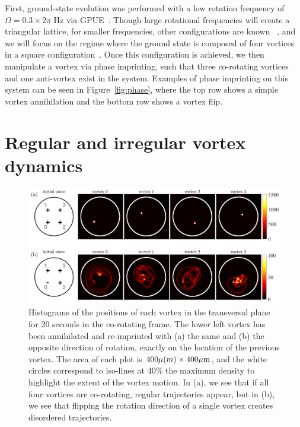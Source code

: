 First, ground-state evolution was performed with a low rotation frequency of $\Omega = 0.3 \times 2\pi$ Hz via GPUE~\cite{schloss2018}.
Though large rotational frequencies will create a triangular lattice, for smaller frequencies, other configurations are known ~\cite{aftalion2001}, and we will focus on the regime where the ground state is composed of four vortices in a square configuration~\cite{zampetaki2013}.
Once this configuration is achieved, we then manipulate a vortex via phase imprinting, such that three co-rotating vortices and one anti-vortex exist in the system.
Examples of phase imprinting on this system can be seen in Figure~\ref{fig:phase}, where the top row shows a simple vortex annihilation and the bottom row shows a vortex flip.

\section{Regular and irregular vortex dynamics}

\begin{figure}
\includegraphics[width=\textwidth]{data/2d/histogram/histogram}

\caption{
Histograms of the positions of each vortex in the transversal plane for 20 seconds in the co-rotating frame.
The lower left vortex has been annihilated and re-imprinted with (a) the same and (b) the opposite direction of rotation, exactly on the location of the previous vortex.
The area of each plot is $400\mu \text(m) \times 400 \mu \text{m}$, and the white circles correspond to iso-lines at 40\% the maximum density to highlight the extent of the vortex motion.
In (a), we see that if all four vortices are co-rotating, regular trajectories appear, but in (b), we see that flipping the rotation direction of a single vortex creates disordered trajectories.
}
\label{fig:histogram}
\end{figure}

